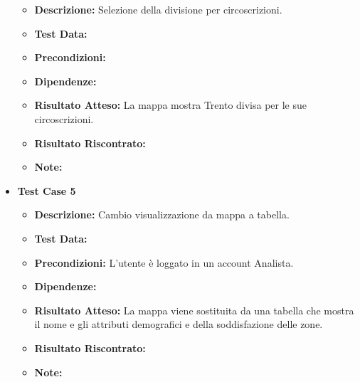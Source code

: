 \begin{itemize}
\begin{itemize}
                    \item \textbf{Descrizione:} Selezione della divisione per circoscrizioni.
                    \item \textbf{Test Data:}
                    \item \textbf{Precondizioni:} 
                    \item \textbf{Dipendenze:}
                    \item \textbf{Risultato Atteso:} La mappa mostra Trento divisa per le sue circoscrizioni.
                    \item \textbf{Risultato Riscontrato:}
                    \item \textbf{Note:}
                \end{itemize}
            \item \textbf{Test Case 5}
                \begin{itemize}
                    \item \textbf{Descrizione:} Cambio visualizzazione da mappa a tabella.
                    \item \textbf{Test Data:}
                    \item \textbf{Precondizioni:} L'utente è loggato in un account Analista.
                    \item \textbf{Dipendenze:}
                    \item \textbf{Risultato Atteso:} La mappa viene sostituita da una tabella che mostra il nome e gli attributi demografici e della soddisfazione delle zone.
                    \item \textbf{Risultato Riscontrato:}
                    \item \textbf{Note:}
                \end{itemize}
        \end{itemize}


